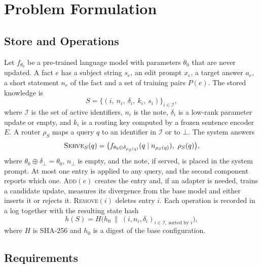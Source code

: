 \documentclass[journal,10pt]{IEEEtran}
\newcommand{\commit}{\textsc{Add}}
\newcommand{\revoke}{\textsc{Remove}}
\newcommand{\serve}{\textsc{Serve}}
\begin{document}
\section{Problem Formulation}
\label{sec:problem}

\subsection{Store and Operations}

Let $f_{\theta_0}$ be a pre-trained language model with parameters $\theta_0$ that are
never updated. A fact $e$ has a subject string $s_e$, an edit prompt $x_e$, a target
answer $a_e$, a short statement $n_e$ of the fact and a set of training pairs $P(e)$.
The stored knowledge is
\begin{equation}
S=\{(i,\ n_i,\ \delta_i,\ k_i,\ s_i)\}_{i\in\mathcal{I}},
\end{equation}
where $\mathcal{I}$ is the set of active identifiers, $n_i$ is the note, $\delta_i$ is a
low-rank parameter update or empty, and $k_i$ is a routing key computed by a frozen
sentence encoder $E$. A router $\rho_S$ maps a query $q$ to an identifier in
$\mathcal{I}$ or to $\bot$. The system answers
\begin{equation}
\serve_S(q)=\big(f_{\theta_0\oplus\delta_{\rho_S(q)}}(q \mid n_{\rho_S(q)}),\ \rho_S(q)\big),
\end{equation}
where $\theta_0\oplus\delta_\bot=\theta_0$, $n_\bot$ is empty, and the note, if served, is
placed in the system prompt. At most one entry is applied to any query, and the second
component reports which one. \commit$(e)$ creates the entry and, if an adapter is needed,
trains a candidate update, measures its divergence from the base model and either
inserts it or rejects it. \revoke$(i)$ deletes entry $i$. Each operation is recorded in a
log together with the resulting state hash
\begin{equation}
h(S)=H\big(h_0\ \|\ (i,n_i,\delta_i)_{i\in\mathcal{I},\ \text{sorted by } i}\big),
\end{equation}
where $H$ is SHA-256 and $h_0$ is a digest of the base configuration.

\subsection{Requirements}
\end{document}
